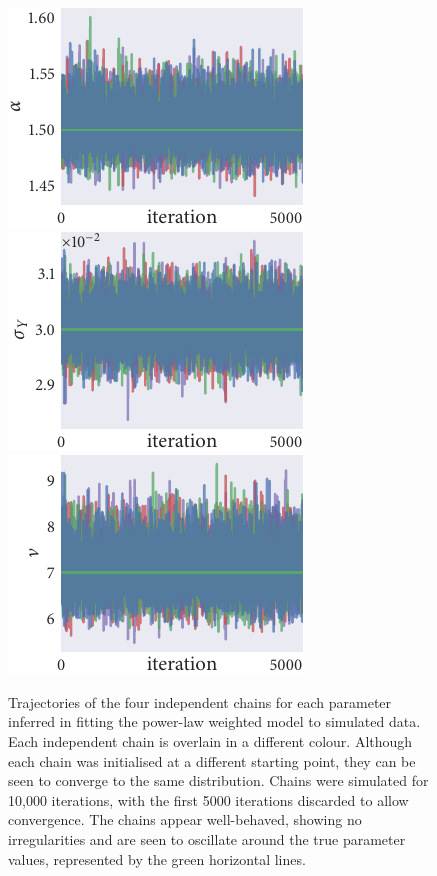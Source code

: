 \begin{figure}[tbp]
  \includegraphics{power/power_trace_alpha.pdf}%
  \includegraphics{power/power_trace_sigma_Y.pdf}%
  \includegraphics{power/power_trace_nu.pdf}
  \caption{Trajectories of the four independent chains for each parameter
    inferred in fitting the power-law weighted model to simulated data. Each
    independent chain is overlain in a different colour. Although each chain
    was initialised at a different starting point, they can be seen to
    converge to the same distribution. Chains were simulated for 10,000
    iterations, with the first 5000 iterations discarded to allow
    convergence. The chains appear well-behaved, showing no irregularities
    and are seen to oscillate around the true parameter values, represented
    by the green horizontal lines.}
  \label{fig:power_trace}
\end{figure}

